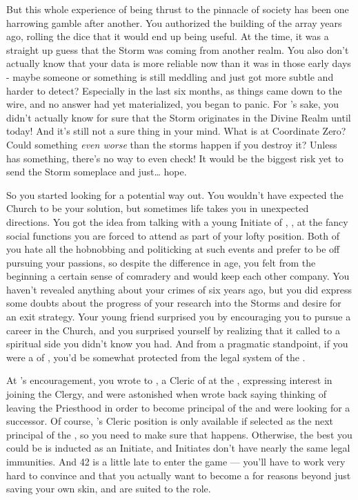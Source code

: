 \documentclass[char]{GL2020}
\begin{document}
But this whole experience of being thrust to the pinnacle of society has been one harrowing gamble after another. You authorized the building of the array years ago, rolling the dice that it would end up being useful. At the time, it was a straight up guess that the Storm was coming from another realm. You also don’t actually know that your data is more reliable now than it was in those early days - maybe someone or something is still meddling and just got more subtle and harder to detect? Especially in the last six months, as things came down to the wire, and no answer had yet materialized, you began to panic. For \cTechGod{}’s sake, you didn’t actually know for sure that the Storm originates in the Divine Realm until today! And it’s still not a sure thing in your mind. What is at Coordinate Zero? Could something \emph{even worse} than the storms happen if you destroy it? Unless \cCurse{} has something, there’s no way to even check! It would be the biggest risk yet to send the Storm someplace and just\ldots{} hope.

So you started looking for a potential way out. You wouldn't have expected the Church to be your solution, but sometimes life takes you in unexpected directions. You got the idea from talking with a young Initiate of \cTechGod{}, \cScholarship{\full}, at the fancy social functions you are forced to attend as part of your lofty position. Both of you hate all the hobnobbing and politicking at such events and prefer to be off pursuing your passions, so despite the difference in age, you felt from the beginning a certain sense of comradery and would keep each other company. You haven't revealed anything about your crimes of six years ago, but you did express some doubts about the progress of your research into the Storms and desire for an exit strategy. Your young friend surprised you by encouraging you to pursue a career in the Church, and you surprised yourself by realizing that it called to a spiritual side you didn't know you had. And from a pragmatic standpoint, if you were a \cHeadScientist{\cleric} of \cTechGod{}, you'd be somewhat protected from the legal system of the \pTech{}. 

At \cScholarship{}’s encouragement, you wrote to \cBeetle{\full}, a Cleric of \cTechGod{} at the \pSchool{}, expressing interest in joining the Clergy, and were astonished when \cBeetle{\they} wrote back saying \cBeetle{\theywere} thinking of leaving the Priesthood in order to become principal of the \pSc{} and were looking for a successor. Of course, \cBeetle{}'s Cleric position is only available if \cBeetle{\theyare} selected as the next principal of the \pSc{}, so you need to make sure that happens. Otherwise, the best you could be is inducted as an Initiate, and Initiates don't have nearly the same legal immunities. And 42 is a little late to enter the game — you'll have to work very hard to convince \cAntiChup{\full} and \cBeetle{} that you actually want to become a \cHeadScientist{\cleric} for reasons beyond just saving your own skin, and are suited to the role. 
\end{document}
